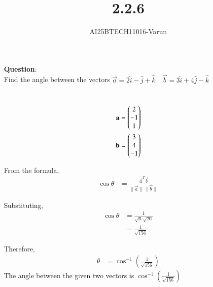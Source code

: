 \documentclass[journal]{IEEEtran}
\begin{document}

\vspace{3cm}

\title{2.2.6}
\author{AI25BTECH11016-Varun}
 \maketitle
{\let\newpage\relax\maketitle}
\renewcommand{\thefigure}{\theenumi}
\renewcommand{\thetable}{\theenumi}
\setlength{\intextsep}{10pt} %

\renewcommand{\thetable}{\theenumi}
\textbf{Question}:\\

  Find the angle between the vectors 
$\vec{a} = 2\hat{i} - \hat{j} + \hat{k} \quad \vec{b} = 3\hat{i} + 4\hat{j} - \hat{k}$

\solution \\

\begin{align}
\mathbf{a} &= \begin{pmatrix}2 \\ -1 \\ 1\end{pmatrix} \\
\mathbf{b} &= \begin{pmatrix}3 \\ 4 \\ -1\end{pmatrix}
\end{align}

From the formula,
\begin{align}
\cos \theta &= \frac{\vec{a} ^{T} \vec{b}}{\lVert \vec{a} \rVert \, \lVert \vec{b} \rVert}
\end{align}

Substituting,
\begin{align}
\cos \theta &= \frac{1}{\sqrt{6}\,\sqrt{26}} \\
&= \frac{1}{\sqrt{156}} \nonumber
\end{align}

Therefore,
\begin{align}
\theta &= \cos^{-1}\left(\frac{1}{\sqrt{156}}\right)
\end{align}
The angle between the given two vectors is $\cos^{-1}\left(\frac{1}{\sqrt{156}}\right)$
\end{document}
